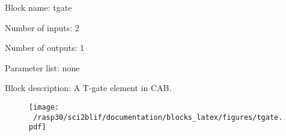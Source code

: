 \pagebreak

Block name: tgate

Number of inputs: 2

Number of outputs: 1

Parameter list: none

Block description: 
A T-gate element in CAB.

\begin{figure}[H]  %
\texttt{[image: ~/rasp30/sci2blif/documentation/blocks\_latex/figures/tgate.pdf]}
\end{figure}

